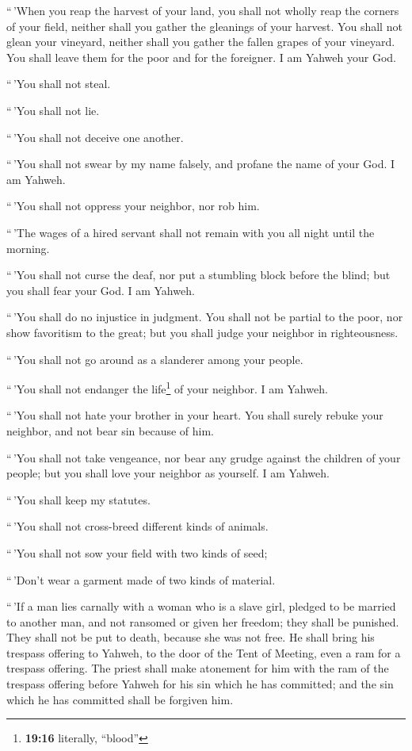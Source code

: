  ``\,'When you reap the harvest of your land, you shall
not wholly reap the corners of your field, neither shall you gather the
gleanings of your harvest.  You shall not glean your
vineyard, neither shall you gather the fallen grapes of your vineyard.
You shall leave them for the poor and for the foreigner. I am Yahweh
your God.

 ``\,'You shall not steal.

``\,'You shall not lie.

``\,'You shall not deceive one another.

 ``\,'You shall not swear by my name falsely, and profane
the name of your God. I am Yahweh.

 ``\,'You shall not oppress your neighbor, nor rob him.

``\,'The wages of a hired servant shall not remain with you all night
until the morning.

 ``\,'You shall not curse the deaf, nor put a stumbling
block before the blind; but you shall fear your God. I am Yahweh.

 ``\,'You shall do no injustice in judgment. You shall
not be partial to the poor, nor show favoritism to the great; but you
shall judge your neighbor in righteousness.

 ``\,'You shall not go around as a slanderer among your
people.

``\,'You shall not endanger the life\footnote{\textbf{19:16} literally,
  ``blood''} of your neighbor. I am Yahweh.

 ``\,'You shall not hate your brother in your heart. You
shall surely rebuke your neighbor, and not bear sin because of him.

 ``\,'You shall not take vengeance, nor bear any grudge
against the children of your people; but you shall love your neighbor as
yourself. I am Yahweh.

 ``\,'You shall keep my statutes.

``\,'You shall not cross-breed different kinds of animals.

``\,'You shall not sow your field with two kinds of seed;

``\,'Don't wear a garment made of two kinds of material.

 ``\,'If a man lies carnally with a woman who is a slave
girl, pledged to be married to another man, and not ransomed or given
her freedom; they shall be punished. They shall not be put to death,
because she was not free.  He shall bring his trespass
offering to Yahweh, to the door of the Tent of Meeting, even a ram for a
trespass offering.  The priest shall make atonement for
him with the ram of the trespass offering before Yahweh for his sin
which he has committed; and the sin which he has committed shall be
forgiven him.

